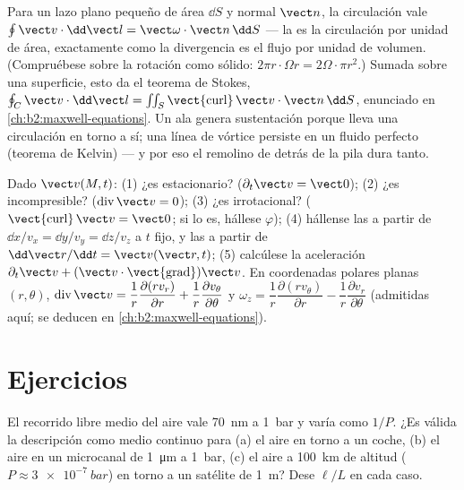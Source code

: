 \begin{remark}\label{rem:b2:fluid-kinematics:stokes}
Para un lazo plano pequeño de área $\dd S$ y normal $\vect n$, la
circulación vale $\oint\vect v\cdot\dd\vect l = \vect\omega\cdot\vect n\,\dd S$ ---
la  es la circulación por unidad de área, exactamente como la
divergencia es el flujo por unidad de volumen. (Compruébese sobre la
rotación como sólido: $2\pi r\cdot\Omega r = 2\Omega\cdot\pi r^2$.) Sumada
sobre una superficie, esto da el teorema de Stokes, $\oint_C\vect v\cdot\dd\vect l = \iint_S
\operatorname{\vect{curl}}\vect v\cdot\vect n\,\dd S$, enunciado en
\cref{ch:b2:maxwell-equations}. Un ala genera sustentación porque lleva
una circulación en torno a sí; una línea de vórtice persiste en un fluido
perfecto (teorema de Kelvin) --- y por eso el remolino de detrás de la
pila dura tanto.
\end{remark}

\begin{method}\label{met:b2:fluid-kinematics:reading}
Dado $\vect v(M, t)$: (1) ¿es estacionario? ($\partial_t\vect v = \vect 0$);
(2) ¿es incompresible? ($\operatorname{div}\vect v = 0$); (3) ¿es
irrotacional? ($\operatorname{\vect{curl}}\vect v = \vect 0$; si lo es,
hállese $\varphi$); (4) hállense las  a partir de $\dd x/v_x = \dd y/v_y = \dd z/
v_z$ a $t$ fijo, y las  a partir de $\dd\vect r/\dd t = \vect v(\vect r,
t)$; (5) calcúlese la aceleración $\partial_t\vect v + (\vect v\cdot
\operatorname{\vect{grad}})\vect v$. En coordenadas polares planas $(r, \theta)$,
$\operatorname{div}\vect v = \dfrac1r\dfrac{\partial(rv_r)}{\partial r} + \dfrac1r
\dfrac{\partial v_\theta}{\partial\theta}$ y $\omega_z = \dfrac1r\dfrac{\partial(rv_\theta)}
{\partial r} - \dfrac1r\dfrac{\partial v_r}{\partial\theta}$ (admitidas aquí; se
deducen en \cref{ch:b2:maxwell-equations}).
\end{method}

\section{Ejercicios}

\begin{exercise}[$\star$]\label{exo:b2:fluid-kinematics:1}
El recorrido libre medio del aire vale \qty{70}{nm} a \qty{1}{bar} y varía
como $1/P$. ¿Es válida la descripción como medio continuo para (a) el aire
en torno a un coche, (b) el aire en un microcanal de \qty{1}{\micro m} a
\qty{1}{bar}, (c) el aire a \qty{100}{km} de altitud ($P \approx \qty{3e-7}{bar}$)
en torno a un satélite de \qty{1}{m}? Dese $\ell/L$ en cada caso.
\end{exercise}

